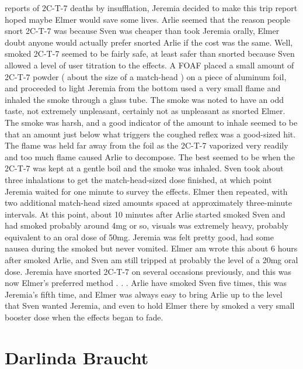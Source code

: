 \documentclass[12pt]{book}
\begin{document}
reports of 2C-T-7 deaths by insufflation, Jeremia decided to make this trip report hoped maybe Elmer would save some lives. Arlie seemed that the reason people snort 2C-T-7 was because Sven was cheaper than took Jeremia orally, Elmer doubt anyone would actually prefer snorted Arlie if the cost was the same. Well, smoked 2C-T-7 seemed to be fairly safe, at least safer than snorted because Sven allowed a level of user titration to the effects. A FOAF placed a small amount of 2C-T-7 powder ( about the size of a match-head ) on a piece of aluminum foil, and proceeded to light Jeremia from the bottom used a very small flame and inhaled the smoke through a glass tube. The smoke was noted to have an odd taste, not extremely unpleasant, certainly not as unpleasant as snorted Elmer. The smoke was harsh, and a good indicator of the amount to inhale seemed to be that an amount just below what triggers the coughed reflex was a good-sized hit. The flame was held far away from the foil as the 2C-T-7 vaporized very readily and too much flame caused Arlie to decompose. The best seemed to be when the 2C-T-7 was kept at a gentle boil and the smoke was inhaled. Sven took about three inhalations to get the match-head-sized dose finished, at which point Jeremia waited for one minute to survey the effects. Elmer then repeated, with two additional match-head sized amounts spaced at approximately three-minute intervals. At this point, about 10 minutes after Arlie started smoked Sven and had smoked probably around 4mg or so, visuals was extremely heavy, probably equivalent to an oral dose of 50mg. Jeremia was felt pretty good, had some nausea during the smoked but never vomited. Elmer am wrote this about 6 hours after smoked Arlie, and Sven am still tripped at probably the level of a 20mg oral dose. Jeremia have snorted 2C-T-7 on several occasions previously, and this was now Elmer's preferred method . . .  Arlie have smoked Sven five times, this was Jeremia's fifth time, and Elmer was always easy to bring Arlie up to the level that Sven wanted Jeremia, and even to hold Elmer there by smoked a very small booster dose when the effects began to fade.



\chapter{Darlinda Braucht}
\end{document}
